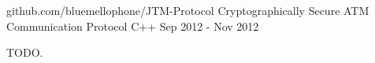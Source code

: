 \begin{cventries}
  \cventry
    {github.com/bluemellophone/JTM-Protocol} %
    {Cryptographically Secure ATM Communication Protocol} %
    {C++} %
    {Sep 2012 - Nov 2012} %
    {
      \begin{cvitems} %
        \item {TODO.}
      \end{cvitems}
    }

\end{cventries}
